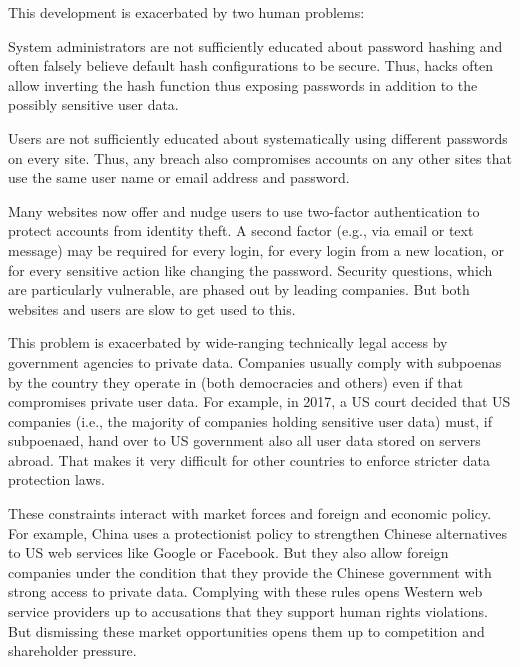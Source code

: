 This development is exacerbated by two human problems:
\begin{compactitem}
 \item System administrators are not sufficiently educated about password hashing and often falsely believe default hash configurations to be secure.
 Thus, hacks often allow inverting the hash function thus exposing passwords in addition to the possibly sensitive user data.
 \item Users are not sufficiently educated about systematically using different passwords on every site.
 Thus, any breach also compromises accounts on any other sites that use the same user name or email address and password.
\end{compactitem}

Many websites now offer and nudge users to use two-factor authentication to protect accounts from identity theft.
A second factor (e.g., via email or text message) may be required for every login, for every login from a new location, or for every sensitive action like changing the password.
Security questions, which are particularly vulnerable, are phased out by leading companies.
But both websites and users are slow to get used to this.
\medskip

This problem is exacerbated by wide-ranging technically legal access by government agencies to private data.
Companies usually comply with subpoenas by the country they operate in (both democracies and others) even if that compromises private user data.
For example, in 2017, a US court decided that US companies (i.e., the majority of companies holding sensitive user data) must, if subpoenaed, hand over to US government also all user data stored on servers abroad.
That makes it very difficult for other countries to enforce stricter data protection laws.

These constraints interact with market forces and foreign and economic policy.
For example, China uses a protectionist policy to strengthen Chinese alternatives to US web services like Google or Facebook.
But they also allow foreign companies under the condition that they provide the Chinese government with strong access to private data.
Complying with these rules opens Western web service providers up to accusations that they support human rights violations.
But dismissing these market opportunities opens them up to competition and shareholder pressure.
\medskip

